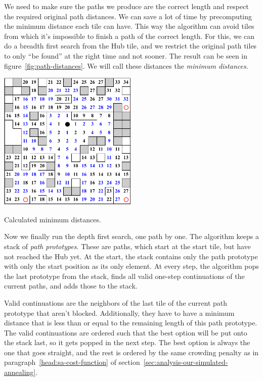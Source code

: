 We need to make sure the paths we produce are the correct length and respect the required original path distances.
We can save a lot of time by precomputing the minimum distance each tile can have.
This way the algorithm can avoid tiles from which it's impossible to finish a path of the correct length.
For this, we can do a breadth first search from the Hub tile, and we restrict the original path tiles to only \enquote{be found} at the right time and not sooner.
The result can be seen in figure~\ref{fig:path-distances}.
We will call these distances the \emph{minimum distances}.

\begin{center}
    \captionsetup{type=figure}
    \includegraphics[width=0.5\textwidth]{img/Path Distances.pdf}
    \caption{Calculated minimum distances.}
    \label{fig:path-distances}
\end{center}

Now we finally run the depth first search, one path by one.
The algorithm keeps a stack of \emph{path prototypes}.
These are paths, which start at the start tile, but have not reached the Hub yet.
At the start, the stack contains only the path prototype with only the start position as its only element.
At every step, the algorithm pops the last prototype from the stack, finds all valid one-step continuations of the current paths, and adds those to the stack.

Valid continuations are the neighbors of the last tile of the current path prototype that aren't blocked.
Additionally, they have to have a minimum distance that is less than or equal to the remaining length of this path prototype.
The valid continuations are ordered such that the best option will be put onto the stack last, so it gets popped in the next step.
The best option is always the one that goes straight, and the rest is ordered by the same crowding penalty as in paragraph~\ref{head:sa-cost-function} of section~\ref{sec:analysis-our-simulated-annealing}.

